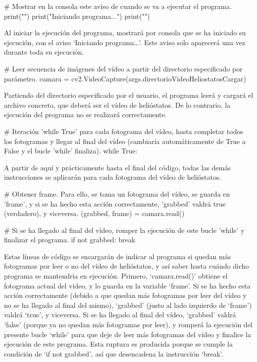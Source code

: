 \documentclass[12pt]{article}
\begin{document}
\# Mostrar en la consola este aviso de cuando se va a ejecutar el programa.
print("")
print("Iniciando programa...")
print("")

Al iniciar la ejecución del programa, mostrará por consola que se ha iniciado su ejecución, con el aviso ‘Iniciando programa…’. Este aviso solo aparecerá una vez durante toda su ejecución.


\# Leer secuencia de imágenes del vídeo a partir del directorio especificado por parámetro.
camara = cv2.VideoCapture(args.directorioVideoHeliostatosCargar)

Partiendo del directorio especificado por el usuario, el programa leerá y cargará el archivo concreto, que deberá ser el vídeo de helióstatos. De lo contrario, la ejecución del programa no se realizará correctamente.


\# Iteración 'while True' para cada fotograma del vídeo, hasta completar todos los fotogramas y llegar al final del vídeo (cambiaría automáticamente de True a False y el bucle 'while' finaliza).
while True:

A partir de aquí y prácticamente hasta el final del código, todas las demás instrucciones se aplicarán para cada fotograma del vídeo de helióstatos.

    
    \# Obtener frame. Para ello, se toma un fotograma del vídeo, se guarda en 'frame', y si se ha hecho esta acción correctamente, 'grabbed' valdrá true (verdadero), y viceversa.
    (grabbed, frame) = camara.read()

    \# Si se ha llegado al final del vídeo, romper la ejecución de este bucle 'while' y finalizar el programa.
    if not grabbed:
        break

Estas líneas de código se encargarán de indicar al programa si quedan más fotogramas por leer o no del vídeo de helióstatos, y así saber hasta cuándo dicho programa se mantendría en ejecución. Primero, ‘camara.read()’ obtiene el fotograma actual del vídeo, y lo guarda en la variable ‘frame’. Si se ha hecho esta acción correctamente (debido a que quedan más fotogramas por leer del vídeo y no se ha llegado al final del mismo), ‘grabbed’ (justo al lado izquierdo de ‘frame’) valdrá ‘true’, y viceversa. Si se ha llegado al final del vídeo, ‘grabbed’ valdrá ‘false’ (porque ya no quedan más fotogramas por leer), y romperá la ejecución del presente bucle ‘while’ para que deje de leer más fotogramas del vídeo y finalice la ejecución de este programa. Esta ruptura es producida porque se cumple la condición de ‘if not grabbed’, así que desencadena la instrucción ‘break’.
\end{document}
